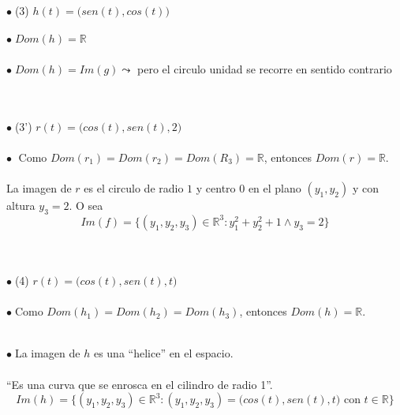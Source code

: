 \documentclass{article}
\theoremstyle{definition}
\theoremstyle{definition}
\theoremstyle{remark}
\newcommand\bl{$\bullet\;$}
\begin{document}
\begin{figure}[h]
\centering
\def\svgwidth{1\textwidth}

\end{figure}
\; \\\\ \bl \textcolor{verdep2}{(3)} $h(t)=\big(sen(t),cos(t)\big)$ \\ \\ 
\bl $Dom(h)=\mathbb{R}$ \\\\
\bl $Dom(h)=Im(g) \leadsto $ pero el circulo unidad se recorre en sentido contrario
\begin{figure}[h]
\centering
\def\svgwidth{1\textwidth}

\end{figure} \; \pagebreak
\; \\\\ \bl \textcolor{verdep2}{(3')} $r(t)=\big(cos(t),sen(t),2\big)$\\\\ \bl 
Como $Dom(r_1)=Dom(r_2)=Dom(R_3)=\mathbb{R}$, entonces $Dom (r)=\mathbb{R}$. \\\\ 
La imagen de $r$ es el circulo de radio $1$ y centro $0$ en el plano $(y_1,y_2)$ y con altura $y_3=2$. O sea \[ 
  Im(f)=\big\{(y_1,y_2,y_3)\in \mathbb{R}^3 : y_1^2+y_2^2+1 \land y_3=2\big\}
\] 
\begin{figure}[h]
\centering
\def\svgwidth{0.25\textwidth}

\end{figure}
\; \\\\ 
\bl \textcolor{verdep2}{(4)} $r(t)=\big(cos(t),sen(t),t\big)$\\\\ \bl  Como $Dom(h_1)=Dom(h_2)=Dom(h_3)$, entonces $Dom(h)=\mathbb{R}$. \\
\begin{figure}[h]
\centering
\def\svgwidth{1\textwidth}

\end{figure}\\
\bl La imagen de $h$ es una ``helice'' en el espacio. \\ \\ \phantom{\bl} ``Es una curva que se enrosca en el cilindro de radio 1''. \[
  Im(h)=\big\{(y_1,y_2,y_3) \in \mathbb{R}^3 : (y_1,y_2,y_3) = \big(cos(t),sen(t),t\big) \text{ con } t \in \mathbb{R}\big\}
  \]
\end{document}
